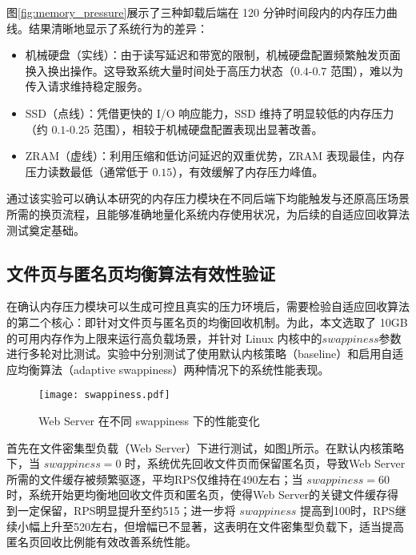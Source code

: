 图\ref{fig:memory_pressure}展示了三种卸载后端在 120 分钟时间段内的内存压力曲线。结果清晰地显示了系统行为的差异：
\begin{itemize}
    \item 机械硬盘（实线）：由于读写延迟和带宽的限制，机械硬盘配置频繁触发页面换入换出操作。这导致系统大量时间处于高压力状态（$0.4$-$0.7$ 范围），难以为传入请求维持稳定服务。
    \item SSD（点线）：凭借更快的 I/O 响应能力，SSD 维持了明显较低的内存压力（约 $0.1$-$0.25$ 范围），相较于机械硬盘配置表现出显著改善。
    \item ZRAM（虚线）：利用压缩和低访问延迟的双重优势，ZRAM 表现最佳，内存压力读数最低（通常低于 $0.15$），有效缓解了内存压力峰值。
\end{itemize}

通过该实验可以确认本研究的内存压力模块在不同后端下均能触发与还原高压场景所需的换页流程，且能够准确地量化系统内存使用状况，为后续的自适应回收算法测试奠定基础。


\subsection{文件页与匿名页均衡算法有效性验证}
\label{sec:file_page_anonymous_page_balance_algorithm_validation}

在确认内存压力模块可以生成可控且真实的压力环境后，需要检验自适应回收算法的第二个核心：即针对文件页与匿名页的均衡回收机制。为此，本文选取了 10GB 的可用内存作为上限来运行高负载场景，并针对 Linux 内核中的\(swappiness\)参数进行多轮对比测试。实验中分别测试了使用默认内核策略（baseline）和启用自适应均衡算法（adaptive swappiness）两种情况下的系统性能表现。

\begin{figure}[htbp]
    \centering
    \texttt{[image: swappiness.pdf]}
    \caption{Web Server 在不同 swappiness 下的性能变化}
    \label{fig:web_server_swappiness}
\end{figure}

首先在文件密集型负载（Web Server）下进行测试，如图\ref{fig:web_server_swappiness}所示。在默认内核策略下，当 \(swappiness=0\) 时，系统优先回收文件页而保留匿名页，导致Web Server所需的文件缓存被频繁驱逐，平均RPS仅维持在490左右；当 \(swappiness=60\) 时，系统开始更均衡地回收文件页和匿名页，使得Web Server的关键文件缓存得到一定保留，RPS明显提升至约515；进一步将 \(swappiness\) 提高到100时，RPS继续小幅上升至520左右，但增幅已不显著，这表明在文件密集型负载下，适当提高匿名页回收比例能有效改善系统性能。

